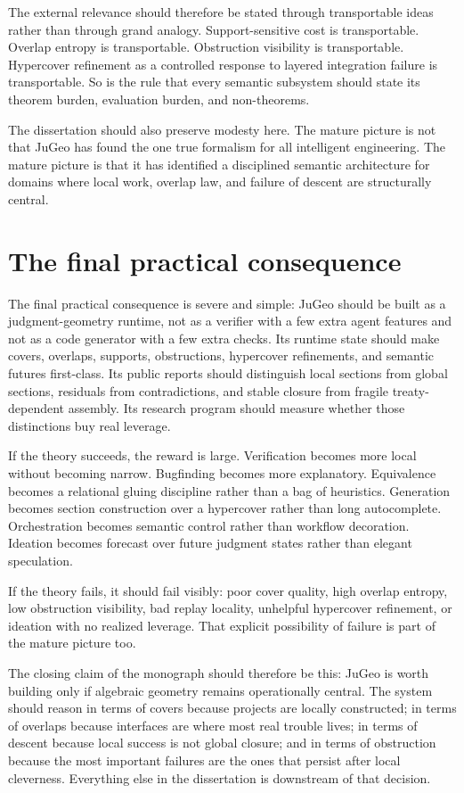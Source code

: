 \documentclass[11pt]{report}
\begin{document}
The external relevance should therefore be stated through transportable ideas rather than through grand analogy. Support-sensitive cost is transportable. Overlap entropy is transportable. Obstruction visibility is transportable. Hypercover refinement as a controlled response to layered integration failure is transportable. So is the rule that every semantic subsystem should state its theorem burden, evaluation burden, and non-theorems.

The dissertation should also preserve modesty here. The mature picture is not that JuGeo has found the one true formalism for all intelligent engineering. The mature picture is that it has identified a disciplined semantic architecture for domains where local work, overlap law, and failure of descent are structurally central.

\section{The final practical consequence}
The final practical consequence is severe and simple: JuGeo should be built as a judgment-geometry runtime, not as a verifier with a few extra agent features and not as a code generator with a few extra checks. Its runtime state should make covers, overlaps, supports, obstructions, hypercover refinements, and semantic futures first-class. Its public reports should distinguish local sections from global sections, residuals from contradictions, and stable closure from fragile treaty-dependent assembly. Its research program should measure whether those distinctions buy real leverage.

If the theory succeeds, the reward is large. Verification becomes more local without becoming narrow. Bugfinding becomes more explanatory. Equivalence becomes a relational gluing discipline rather than a bag of heuristics. Generation becomes section construction over a hypercover rather than long autocomplete. Orchestration becomes semantic control rather than workflow decoration. Ideation becomes forecast over future judgment states rather than elegant speculation.

If the theory fails, it should fail visibly: poor cover quality, high overlap entropy, low obstruction visibility, bad replay locality, unhelpful hypercover refinement, or ideation with no realized leverage. That explicit possibility of failure is part of the mature picture too.

The closing claim of the monograph should therefore be this: JuGeo is worth building only if algebraic geometry remains operationally central. The system should reason in terms of covers because projects are locally constructed; in terms of overlaps because interfaces are where most real trouble lives; in terms of descent because local success is not global closure; and in terms of obstruction because the most important failures are the ones that persist after local cleverness. Everything else in the dissertation is downstream of that decision.
\end{document}
